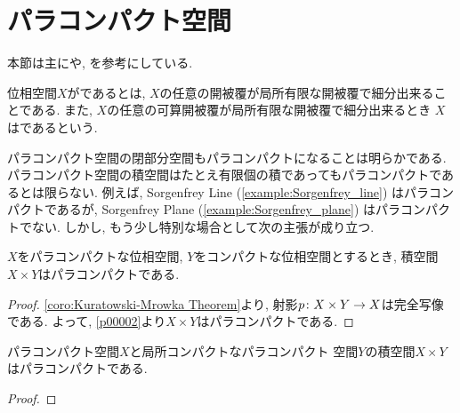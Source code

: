 \documentclass[uplatex, dvipdfmx, a4paper, 12pt, class=jsbook, crop=false]{standalone}
\begin{document}
\section{パラコンパクト空間}
\label{sec:paracompact-spaces}

\newcommand{\starset}[2]{\mathrm{St}\left(#1 , \: #2\right)}
\newcommand{\sstarset}[3]{\mathrm{St}^{#1}\left(#2 , \: #3 \right)}

\begin{source}
	本節は主に\cite[Chapter 5]{Engelking1989GT}や\cite[第8章]{Morita1981ja}, \cite[第3章]{KodamaNagami1974ja}を参考にしている.
\end{source}

\begin{definition}
	位相空間$ X $がであるとは,
	$ X $の任意の開被覆が局所有限な開被覆で細分出来ることである.
	また, $ X $の任意の可算開被覆が局所有限な開被覆で細分出来るとき
	$ X $はであるという.
\end{definition}

パラコンパクト空間の閉部分空間もパラコンパクトになることは明らかである.
パラコンパクト空間の積空間はたとえ有限個の積であってもパラコンパクトであるとは限らない.
例えば, Sorgenfrey Line (\ref{example:Sorgenfrey_line}) はパラコンパクトであるが,
Sorgenfrey Plane (\ref{example:Sorgenfrey_plane}) はパラコンパクトでない.
しかし, もう少し特別な場合として次の主張が成り立つ.

\begin{proposition}
	$ X $をパラコンパクトな位相空間, $ Y $をコンパクトな位相空間とするとき, 積空間$ X \times Y $はパラコンパクトである.
\end{proposition}

\begin{proof}
	\cref{coro:Kuratowski-Mrowka Theorem}より, 射影$ p\colon X \times Y\to X $は完全写像である.
	よって, \cref{p00002}より$ X \times Y $はパラコンパクトである.
\end{proof}

\begin{proposition}
	パラコンパクト空間$ X $と局所コンパクトなパラコンパクト  空間$ Y $の積空間$ X \times Y $はパラコンパクトである.
\end{proposition}

\begin{proof}
	\WIP
\end{proof}
\end{document}
